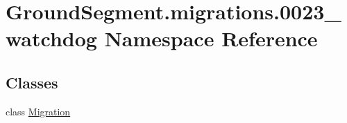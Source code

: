 \hypertarget{namespace_ground_segment_1_1migrations_1_10023__watchdog}{}\section{Ground\+Segment.\+migrations.0023\+\_\+watchdog Namespace Reference}
\label{namespace_ground_segment_1_1migrations_1_10023__watchdog}
\subsection*{Classes}
\begin{DoxyCompactItemize}
\item 
class \hyperlink{class_ground_segment_1_1migrations_1_10023__watchdog_1_1_migration}{Migration}
\end{DoxyCompactItemize}
